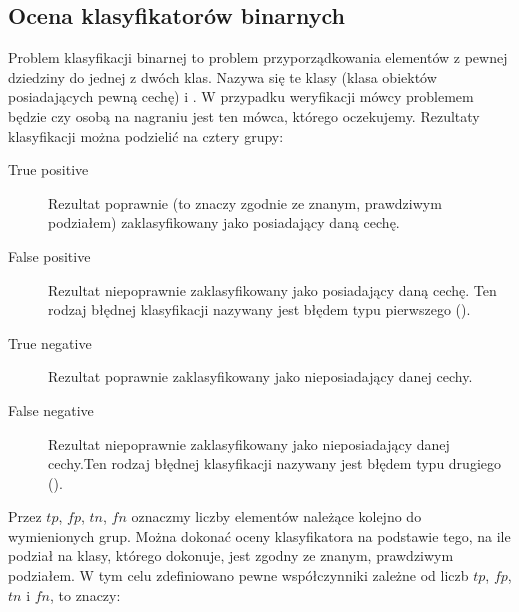 

\subsection{Ocena klasyfikatorów binarnych}

Problem klasyfikacji binarnej to problem przyporządkowania elementów z
pewnej dziedziny do jednej z dwóch klas. Nazywa się te klasy
 (klasa obiektów posiadających pewną cechę) i .
W przypadku weryfikacji mówcy problemem będzie czy osobą na nagraniu jest ten mówca, którego oczekujemy.
Rezultaty klasyfikacji można podzielić na cztery grupy:

\begin{description}
    \item[True positive] Rezultat poprawnie (to znaczy zgodnie ze znanym, prawdziwym podziałem) zaklasyfikowany jako posiadający daną cechę.
    \item[False positive] Rezultat niepoprawnie zaklasyfikowany jako posiadający daną cechę. Ten rodzaj błędnej klasyfikacji nazywany jest błędem typu pierwszego ().
    \item[True negative] Rezultat poprawnie zaklasyfikowany jako nieposiadający danej cechy.
    \item[False negative] Rezultat niepoprawnie zaklasyfikowany jako nieposiadający danej cechy.Ten rodzaj błędnej klasyfikacji nazywany jest błędem typu drugiego ().
\end{description}

Przez $tp$, $fp$, $tn$, $fn$ oznaczmy liczby elementów należące kolejno do wymienionych grup.
Można dokonać oceny klasyfikatora na podstawie tego, na ile podział na klasy, którego dokonuje,
jest zgodny ze znanym, prawdziwym podziałem. W tym celu zdefiniowano pewne współczynniki zależne
od liczb $tp$, $fp$, $tn$ i $fn$, to znaczy:

